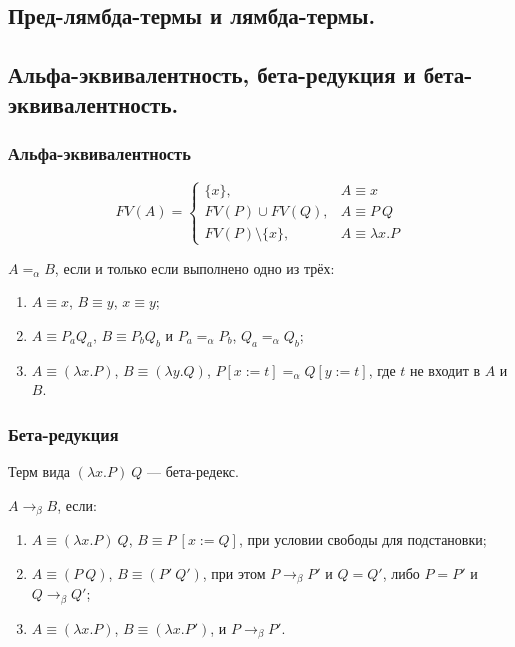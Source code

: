 \documentclass[10pt,a4paper,oneside]{article}
\begin{document}
\subsection{Пред-лямбда-термы и лямбда-термы.}

\subsection{Альфа-эквивалентность, бета-редукция
и бета-эквивалентность.}
\subsubsection{Альфа-эквивалентность}
$$FV(A) = \left\{\begin{array}{ll} \{x\}, & A \equiv x\\
  FV(P)\cup FV(Q), & A \equiv P\ Q\\
  FV(P)\setminus\{x\}, & A \equiv \lambda x.P\end{array}\right.$$

 $A=_\alpha B$, если и только если выполнено одно из трёх:
\begin{enumerate}
\item $A \equiv x$, $B \equiv y$, $x \equiv y$;
\item $A \equiv P_a Q_a$, $B \equiv P_b Q_b$ и $P_a =_\alpha P_b$, $Q_a =_\alpha Q_b$;
\item $A \equiv (\lambda x.P)$, $B \equiv (\lambda y.Q)$, $P[x := t] =_\alpha Q[y := t]$, где $t$ не входит в $A$ и $B$.
\end{enumerate}

\subsubsection{Бета-редукция}
  Терм вида $(\lambda x.P)\ Q$ --- бета-редекс.

  $A \rightarrow_\beta B$, если:
\begin{enumerate}
\item $A \equiv (\lambda x.P)\ Q$, $B \equiv P\ [x := Q]$, при условии свободы для подстановки;
\item $A \equiv (P\ Q)$, $B \equiv (P'\ Q')$, при этом $P \rightarrow_\beta P'$ и $Q = Q'$, либо $P = P'$ и $Q \rightarrow_\beta Q'$;
\item $A \equiv (\lambda x.P)$, $B \equiv (\lambda x.P')$, и $P \rightarrow_\beta P'$.
\end{enumerate}
\end{document}
